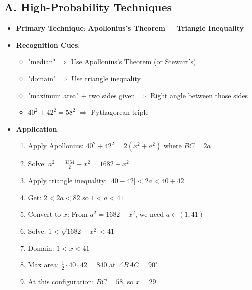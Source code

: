 \documentclass[12pt]{article}
\begin{document}
\begin{techniquesbox}
\subsection*{A. High-Probability Techniques}
\begin{itemize}[leftmargin=*]
    \item \textbf{Primary Technique}: \textbf{Apollonius's Theorem + Triangle Inequality}
    
    \item \textbf{Recognition Cues}: 
    \begin{itemize}
        \item "median" $\Rightarrow$ Use Apollonius's Theorem (or Stewart's)
        \item "domain" $\Rightarrow$ Use triangle inequality
        \item "maximum area" + two sides given $\Rightarrow$ Right angle between those sides
        \item $40^2 + 42^2 = 58^2$ $\Rightarrow$ Pythagorean triple
    \end{itemize}
    
    \item \textbf{Application}:
    \begin{enumerate}
        \item Apply Apollonius: $40^2 + 42^2 = 2(x^2 + a^2)$ where $BC = 2a$
        \item Solve: $a^2 = \frac{3364}{2} - x^2 = 1682 - x^2$
        \item Apply triangle inequality: $|40 - 42| < 2a < 40 + 42$
        \item Get: $2 < 2a < 82$ so $1 < a < 41$
        \item Convert to $x$: From $a^2 = 1682 - x^2$, we need $a \in (1, 41)$
        \item Solve: $1 < \sqrt{1682 - x^2} < 41$
        \item Domain: $1 < x < 41$
        \item Max area: $\frac{1}{2} \cdot 40 \cdot 42 = 840$ at $\angle BAC = 90^{\circ}$
        \item At this configuration: $BC = 58$, so $x = 29$
    \end{enumerate}
\end{itemize}


\end{techniquesbox}
\end{document}
